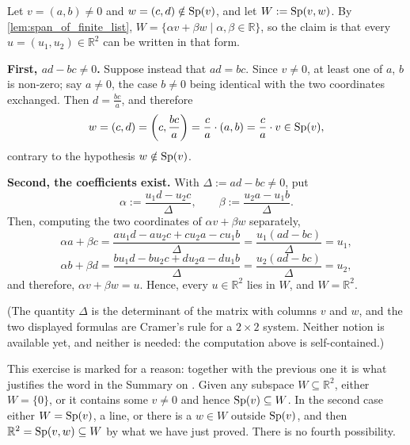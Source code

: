 \begin{exercisesolution}
\label{sol:two_vectors_span_plane}
Let $v = (a, b) \ne 0$ and $w = (c, d) \notin \operatorname{Sp}(v)$, and let $W := \operatorname{Sp}(v, w)$. By \cref{lem:span_of_finite_list}, $W = \{\alpha v + \beta w \mid \alpha, \beta \in \mathbb{R}\}$, so the claim is that every $u = (u_1, u_2) \in \mathbb{R}^2$ can be written in that form.

\textbf{First, $ad - bc \ne 0$.} Suppose instead that $ad = bc$. Since $v \ne 0$, at least one of $a$, $b$ is non-zero; say $a \ne 0$, the case $b \ne 0$ being identical with the two coordinates exchanged. Then $d = \frac{bc}{a}$, and therefore
\[
    w = (c, d) = \left(c, \frac{bc}{a}\right) = \frac{c}{a} \cdot (a, b) = \frac{c}{a} \cdot v \in \operatorname{Sp}(v),
\]
contrary to the hypothesis $w \notin \operatorname{Sp}(v)$.

\textbf{Second, the coefficients exist.} With $\Delta := ad - bc \ne 0$, put
\[
    \alpha := \frac{u_1 d - u_2 c}{\Delta}, \qquad \beta := \frac{u_2 a - u_1 b}{\Delta}.
\]
Then, computing the two coordinates of $\alpha v + \beta w$ separately,
\[
    \alpha a + \beta c = \frac{a u_1 d - a u_2 c + c u_2 a - c u_1 b}{\Delta} = \frac{u_1 (ad - bc)}{\Delta} = u_1,
\]
\[
    \alpha b + \beta d = \frac{b u_1 d - b u_2 c + d u_2 a - d u_1 b}{\Delta} = \frac{u_2 (ad - bc)}{\Delta} = u_2,
\]
and therefore, $\alpha v + \beta w = u$. Hence, every $u \in \mathbb{R}^2$ lies in $W$, and $W = \mathbb{R}^2$.

(The quantity $\Delta$ is the determinant of the matrix with columns $v$ and $w$, and the two displayed formulas are Cramer's rule for a $2 \times 2$ system. Neither notion is available yet, and neither is needed: the computation above is self-contained.)

This exercise is marked  for a reason: together with the previous one it is what justifies the word  in the Summary on . Given any subspace $W \subseteq \mathbb{R}^2$, either $W = \{0\}$, or it contains some $v \ne 0$ and hence $\operatorname{Sp}(v) \subseteq W$. In the second case either $W = \operatorname{Sp}(v)$, a line, or there is a $w \in W$ outside $\operatorname{Sp}(v)$, and then $\mathbb{R}^2 = \operatorname{Sp}(v,w) \subseteq W$ by what we have just proved. There is no fourth possibility.
\end{exercisesolution}

